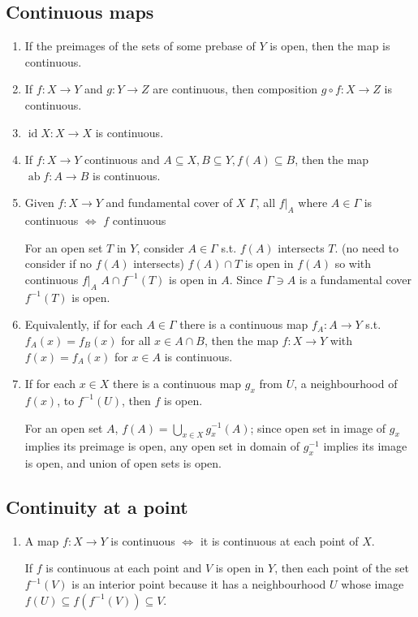 \documentclass{article}
\DeclareMathOperator{\id}{id}
\DeclareMathOperator{\ab}{ab}
\begin{document}
\subsection{Continuous maps}
\begin{enumerate}
\item If the preimages of the sets of some prebase of \(Y\) is open, then the map is continuous.
\item If \(f:X\to Y\) and \(g:Y\to Z\) are continuous, then composition \(g\circ f:X\to Z\) is continuous.
\item \(\id X:X\to X\) is continuous.
\item If \(f:X\to Y\) continuous and \(A\subseteq X,B\subseteq Y,f(A)\subseteq B\), then the map \(\ab f:A\to B\) is continuous.
\item Given \(f:X\to Y\) and fundamental cover of \(X\) \(\Gamma\), all \(f|_{A}\) where \(A\in\Gamma\) is continuous \(\Longleftrightarrow\) \(f\) continuous

For an open set \(T\) in \(Y\), consider \(A\in \Gamma\) s.t. \(f(A)\) intersects \(T\). (no need to consider if no \(f(A)\) intersects)
\(f(A)\cap T\) is open in \(f(A)\) so with continuous \(f|_{A}\) \(A\cap f^{-1}(T)\) is open in \(A\). Since \(\Gamma\ni A\) is a fundamental cover \(f^{-1}(T)\) is open.

\item Equivalently, if for each \(A\in \Gamma\) there is a continuous map \(f_{A}:A\to Y\) s.t. \(f_{A}(x)=f_{B}(x)\) for all \(x\in A\cap B\), then the map \(f:X \to Y\) with \(f(x)=f_{A}(x)\) for \(x\in A\) is continuous.
\item If for each \(x\in X\) there is a continuous map \(g_{x}\) from \(U\), a neighbourhood of \(f(x)\), to \(f^{-1}(U)\), then \(f\) is open.

For an open set \(A\), \(f(A)=\bigcup_{x\in X}g_{x}^{-1}(A)\); since open set in image of \(g_{x}\) implies its preimage is open, any open set in domain of \(g_{x}^{-1}\) implies its image is open, and union of open sets is open.
\end{enumerate}
\subsection{Continuity at a point}
\begin{enumerate}
\item A map \(f:X\to Y\) is continuous \(\Longleftrightarrow\) it is continuous at each point of \(X\).

If \(f\) is continuous at each point and \(V\) is open in \(Y\), then each point of the set \(f^{-1}(V)\) is an interior point because it has a neighbourhood \(U\) whose image \(f(U)\subseteq f(f^{-1}(V))\subseteq V\).
\end{enumerate}
\end{document}
